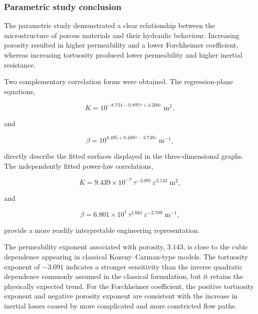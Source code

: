 \documentclass[a4paper]{article}
\begin{document}
\subsubsection{Parametric study conclusion}
\label{sec:parametric_study_conclusion}

The parametric study demonstrated a clear relationship between the
microstructure of porous materials and their hydraulic behaviour. Increasing
porosity resulted in higher permeability and a lower Forchheimer coefficient,
whereas increasing tortuosity produced lower permeability and higher inertial
resistance.

Two complementary correlation forms were obtained. The regression-plane
equations,

\begin{equation}
K
=
10^{-8.734-0.897\tau+4.200\varepsilon}
\;\mathrm{m^{2}},
\end{equation}

and

\begin{equation}
\beta
=
10^{4.495+0.488\tau-3.749\varepsilon}
\;\mathrm{m^{-1}},
\end{equation}

directly describe the fitted surfaces displayed in the three-dimensional
graphs. The independently fitted power-law correlations,

\begin{equation}
K
=
9.439\times10^{-7}
\,\tau^{-3.091}
\,\varepsilon^{3.143}
\;\mathrm{m^{2}},
\end{equation}

and

\begin{equation}
\beta
=
6.801\times10^{1}
\,\tau^{1.661}
\,\varepsilon^{-2.709}
\;\mathrm{m^{-1}},
\end{equation}

provide a more readily interpretable engineering representation.

The permeability exponent associated with porosity, $3.143$, is close to the
cubic dependence appearing in classical Kozeny--Carman-type models. The
tortuosity exponent of $-3.091$ indicates a stronger sensitivity than the
inverse quadratic dependence commonly assumed in the classical formulation,
but it retains the physically expected trend. For the Forchheimer coefficient,
the positive tortuosity exponent and negative porosity exponent are consistent
with the increase in inertial losses caused by more complicated and more
constricted flow paths.
\end{document}
